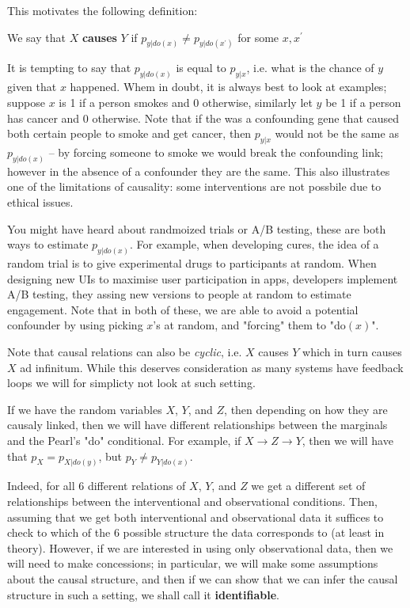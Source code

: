 This motivates the following definition:

\begin{definition}
    We say that $X$ \textbf{causes} $Y$ if $p_{y|do(x)} \neq p_{y|do(x^\prime)}$ for some
    $x, x^\prime$
\end{definition}

It is tempting to say that $p_{y|do(x)}$ is equal to $p_{y|x}$, i.e. what is the chance of $y$ given that $x$ happened.
Whem in doubt, it is always best to look at examples; suppose
$x$ is 1 if a person smokes and 0 otherwise, similarly let $y$ be 1 if a person 
has cancer and 0 otherwise. Note that if the was a confounding gene that caused both certain people to smoke 
and get cancer, then $p_{y|x}$ would not be the same as $p_{y|do(x)}$ -- by forcing someone to smoke we would 
break the confounding link; however in the absence of a confounder they are the same. This also illustrates 
one of the limitations of causality: some interventions are not possbile due to ethical issues.

You might have heard about randmoized trials or A/B testing, these are both ways to estimate $p_{y|do(x)}$.
For example, when developing cures, the idea of a random trial is to give experimental drugs to participants
at random. When designing new UIs to maximise user participation in apps, developers implement A/B testing, 
they assing new versions to people at random to estimate engagement. Note that in both of these, we are able 
to avoid a potential confounder by using picking $x$'s at random, and "forcing" them to "do$(x)$".

Note that causal relations can also be \textit{cyclic}, i.e. $X$ causes $Y$ which in turn causes 
$X$ ad infinitum. While this deserves consideration as many systems have feedback loops we will
for simplicty not look at such setting.

If we have the random variables $X$, $Y$, and $Z$, then depending on how they are causaly linked, then 
we will have different relationships between the marginals and the Pearl's "do" conditional. For example,
if $X \rightarrow Z \rightarrow Y$, then we will have that $p_X = p_{X|do(y)}$, but $p_Y \neq p_{Y|do(x)}$. 

Indeed, for all 6 different relations of $X$, $Y$, and $Z$ we get a different set of relationships between 
the interventional and observational conditions. Then, assuming that we get both interventional and observational data it suffices to check to which of the 6 
possible structure the data corresponds to (at least in theory). However, if we are interested in using only 
observational data, then we will need to make concessions; in particular, we will make some assumptions about 
the causal structure, and then if we can show that we can infer the causal structure in such a setting, we 
shall call it \textbf{identifiable}.

